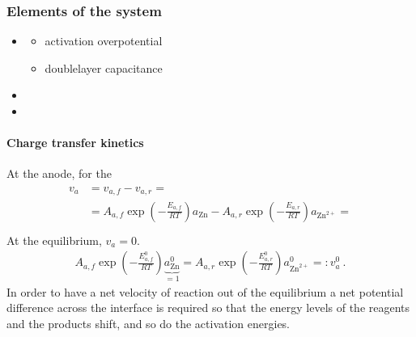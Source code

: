 \documentclass[letterpaper,10pt,english]{jupyterBook}
\begin{document}
\subsubsection*{Elements of the system}
\begin{itemize}
\item {} 
\sphinxAtStartPar
{}
\begin{itemize}
\item {} 
\sphinxAtStartPar
activation overpotential

\item {} 
\sphinxAtStartPar
double\sphinxhyphen{}layer capacitance

\end{itemize}

\item {} 
\sphinxAtStartPar
{}

\item {} 
\sphinxAtStartPar
{}

\end{itemize}


\paragraph{Charge transfer kinetics}
\label{\detokenize{ch/batteries-daniell:charge-transfer-kinetics}}\label{\detokenize{ch/batteries-daniell:electro-chemical-batteries-daniell-regimes-load-reaction-kinetics}}
\sphinxAtStartPar
At the anode, for the 
\begin{equation*}
\begin{split}\begin{aligned}
  v_a
  & = v_{a,f} - v_{a,r} = \\
  & = A_{a,f} \exp \left( - \frac{E_{a,f}}{RT}  \right) a_{\text{Zn}} - A_{a,r} \exp \left( - \frac{E_{a,r}}{RT}  \right) a_{\text{Zn}^{2+}} = \\ 
\end{aligned}\end{split}
\end{equation*}
\sphinxAtStartPar
At the equilibrium, \(v_a = 0\).
\begin{equation*}
\begin{split}A_{a,f} \exp \left( - \frac{E^0_{a,f}}{RT}  \right) \underbrace{a_\text{Zn}^0}_{ = 1} = A_{a,r} \exp \left( - \frac{E^0_{a,r}}{RT}  \right) a_{\text{Zn}^{2+}}^0 =: v_{a}^0 \ .\end{split}
\end{equation*}
\sphinxAtStartPar
In order to have a net velocity of reaction \sphinxhyphen{} out of the equilibrium \sphinxhyphen{} a net potential difference across the interface is required so that the energy levels of the reagents and the products shift, and so do the activation energies.
\end{document}
